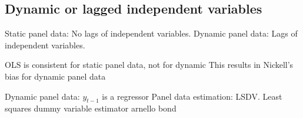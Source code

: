 
\subsection{Dynamic or lagged independent variables}

Static panel data: No lags of independent variables.
Dynamic panel data: Lags of independent variables.

OLS is consistent for static panel data, not for dynamic
This results in Nickell's bias for dynamic panel data

Dynamic panel data: \(y_{t-1}\) is a regressor
Panel data estimation: LSDV. Least squares dummy variable estimator
arnello bond

